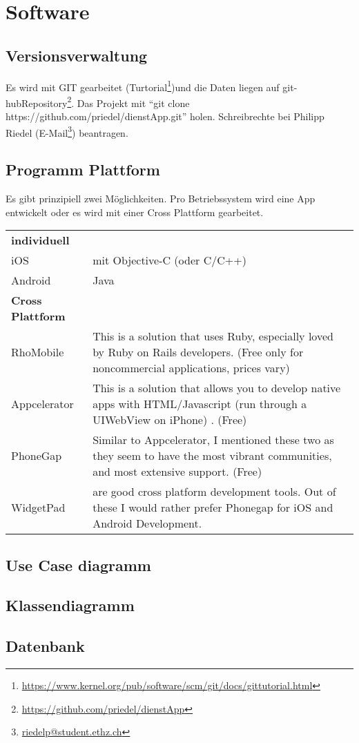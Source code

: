 \chapter{Software}

\section{Versionsverwaltung}
Es wird mit GIT gearbeitet (Turtorial\footnote{\url{https://www.kernel.org/pub/software/scm/git/docs/gittutorial.html}})und die Daten liegen auf git-hub{Repository\footnote{\url{https://github.com/priedel/dienstApp}}}. Das Projekt mit \enquote{git clone https://github.com/priedel/dienstApp.git} holen.
 Schreibrechte bei Philipp Riedel (E-Mail\footnote{\href{mailto:riedelp@student.ethz.ch}{riedelp@student.ethz.ch}}) beantragen.

\section{Programm Plattform}

Es gibt prinzipiell zwei Möglichkeiten. Pro Betriebssystem wird eine App entwickelt oder es wird mit einer Cross Plattform gearbeitet\cite{appEinf}.


\begin{tabularx}{\textwidth}{lX}
\textbf{individuell}\cite{appEinf}&\\
iOS & mit  Objective-C (oder C/C++)\\
Android & Java \\
\textbf{Cross Plattform}\cite{crossPlat}&\\
    RhoMobile & This is a solution that uses Ruby, especially loved by Ruby on Rails developers. (Free only for noncommercial applications, prices vary)\\
    Appcelerator & This is a solution that allows you to develop native apps with HTML/Javascript (run through a UIWebView on iPhone) . (Free)\\
    PhoneGap & Similar to Appcelerator, I mentioned these two as they seem to have the most vibrant communities, and most extensive support. (Free)\\
    WidgetPad & are good cross platform development tools. Out of these I would rather prefer Phonegap for iOS and Android Development.\\
\end{tabularx}
\centering{{$\vdots$}}

\section{Use Case diagramm}
\section{Klassendiagramm}

\section{Datenbank}

